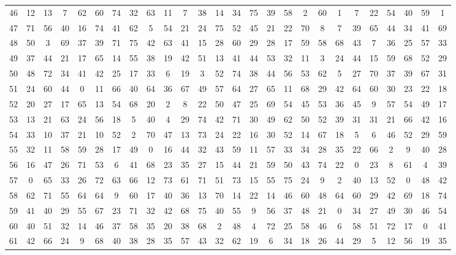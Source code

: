 \begin{table}
\begin{tabular}{c c c c c c c c c c c c c c c c c c c c c c c c c c }
46 & 12 & 13 & 7 & 62 & 60 & 74 & 32 & 63 & 11 & 7 & 38 & 14 & 34 & 75 & 39 & 58 & 2 & 60 & 1 & 7 & 22 & 54 & 40 & 59 & 1 \\
47 & 71 & 56 & 40 & 16 & 74 & 41 & 62 & 5 & 54 & 21 & 24 & 75 & 52 & 45 & 21 & 22 & 70 & 8 & 7 & 39 & 65 & 44 & 34 & 41 & 69 \\
48 & 50 & 3 & 69 & 37 & 39 & 71 & 75 & 42 & 63 & 41 & 15 & 28 & 60 & 29 & 28 & 17 & 59 & 58 & 68 & 43 & 7 & 36 & 25 & 57 & 33 \\
49 & 37 & 44 & 21 & 17 & 65 & 14 & 55 & 38 & 19 & 42 & 51 & 13 & 41 & 44 & 53 & 32 & 11 & 3 & 24 & 44 & 15 & 59 & 68 & 52 & 29 \\
50 & 48 & 72 & 34 & 41 & 42 & 25 & 17 & 33 & 6 & 19 & 3 & 52 & 74 & 38 & 44 & 56 & 53 & 62 & 5 & 27 & 70 & 37 & 39 & 67 & 31 \\
51 & 24 & 60 & 44 & 0 & 11 & 66 & 40 & 64 & 36 & 67 & 49 & 57 & 64 & 27 & 65 & 11 & 68 & 29 & 42 & 64 & 60 & 30 & 23 & 22 & 18 \\
52 & 20 & 27 & 17 & 65 & 13 & 54 & 68 & 20 & 2 & 8 & 22 & 50 & 47 & 25 & 69 & 54 & 45 & 53 & 36 & 45 & 9 & 57 & 54 & 49 & 17 \\
53 & 13 & 21 & 63 & 24 & 56 & 18 & 5 & 40 & 4 & 29 & 74 & 42 & 71 & 30 & 49 & 62 & 50 & 52 & 39 & 31 & 31 & 21 & 66 & 42 & 16 \\
54 & 33 & 10 & 37 & 21 & 10 & 52 & 2 & 70 & 47 & 13 & 73 & 24 & 22 & 16 & 30 & 52 & 14 & 67 & 18 & 5 & 6 & 46 & 52 & 29 & 59 \\
55 & 32 & 11 & 58 & 59 & 28 & 17 & 49 & 0 & 16 & 44 & 32 & 43 & 59 & 11 & 57 & 33 & 34 & 28 & 35 & 22 & 66 & 2 & 9 & 40 & 28 \\
56 & 16 & 47 & 26 & 71 & 53 & 6 & 41 & 68 & 23 & 35 & 27 & 15 & 44 & 21 & 59 & 50 & 43 & 74 & 22 & 0 & 23 & 8 & 61 & 4 & 39 \\
57 & 0 & 65 & 33 & 26 & 72 & 63 & 66 & 12 & 73 & 61 & 71 & 51 & 73 & 15 & 55 & 75 & 24 & 9 & 2 & 40 & 13 & 52 & 0 & 48 & 42 \\
58 & 62 & 71 & 55 & 64 & 64 & 9 & 60 & 17 & 40 & 36 & 13 & 70 & 14 & 22 & 14 & 46 & 60 & 48 & 64 & 60 & 29 & 42 & 69 & 18 & 74 \\
59 & 41 & 40 & 29 & 55 & 67 & 23 & 71 & 32 & 42 & 68 & 75 & 40 & 55 & 9 & 56 & 37 & 48 & 21 & 0 & 34 & 27 & 49 & 30 & 46 & 54 \\
60 & 40 & 51 & 32 & 14 & 46 & 37 & 58 & 35 & 20 & 38 & 68 & 2 & 48 & 4 & 72 & 25 & 58 & 46 & 6 & 58 & 51 & 72 & 17 & 0 & 41 \\
61 & 42 & 66 & 24 & 9 & 68 & 40 & 38 & 28 & 35 & 57 & 43 & 32 & 62 & 19 & 6 & 34 & 18 & 26 & 44 & 29 & 5 & 12 & 56 & 19 & 35 \\

\end{tabular}
\end{table}
